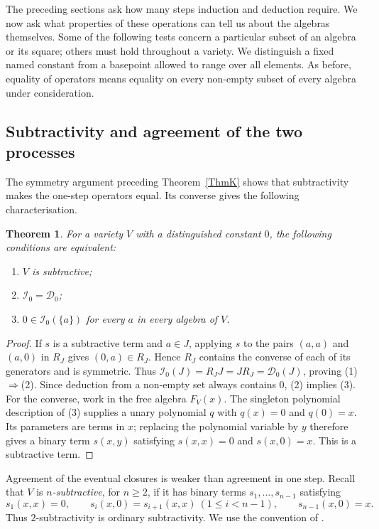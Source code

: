 \documentclass[12pt,english]{amsart}
\newtheorem{theorem}{Theorem}[section]
\theoremstyle{definition}
\numberwithin{equation}{section}
\theoremstyle{remark}
\begin{document}
The preceding sections ask how many steps induction and deduction
require. We now ask what properties of these operations can tell us
about the algebras themselves. Some of the following tests concern a
particular subset of an algebra or its square; others must hold
throughout a variety. We distinguish a fixed named constant from a
basepoint allowed to range over all elements. As before, equality of
operators means equality on every non-empty subset of every algebra
under consideration.

\subsection{Subtractivity and agreement of the two processes}
\label{SubsecDetSubtractivity}

The symmetry argument preceding Theorem~\ref{ThmK} shows that
subtractivity makes the one-step operators equal. Its converse gives
the following characterisation.

\begin{theorem}\label{ThmDetSubtractivity}
For a variety $V$ with a distinguished constant $0$, the following
conditions are equivalent:
\begin{enumerate}
\item $V$ is subtractive;
\item $\mathcal I_0=\mathcal D_0$;
\item $0\in\mathcal I_0(\{a\})$ for every $a$ in every algebra of $V$.
\end{enumerate}
\end{theorem}

\begin{proof}
If $s$ is a subtractive term and $a\in J$, applying $s$ to the pairs
$(a,a)$ and $(a,0)$ in $R_J$ gives $(0,a)\in R_J$. Hence $R_J$
contains the converse of each of its generators and is symmetric.
Thus $\mathcal I_0(J)=R_JJ=JR_J=\mathcal D_0(J)$, proving
(1)$\Rightarrow$(2). Since deduction from a non-empty set always
contains $0$, (2) implies (3). For the converse,
work in the free algebra $F_V(x)$. The singleton polynomial description
of (3) supplies a unary polynomial $q$ with $q(x)=0$ and $q(0)=x$.
Its parameters are terms in $x$; replacing the polynomial variable by
$y$ therefore gives a binary term $s(x,y)$ satisfying
$s(x,x)=0$ and $s(x,0)=x$. This is a subtractive term.
\end{proof}

Agreement of the eventual closures is weaker than agreement in one
step. Recall that $V$ is \emph{$n$-subtractive}, for $n\geqslant2$,
if it has binary terms $s_1,\ldots,s_{n-1}$ satisfying
\begin{equation}\label{EqDetNSubtractive}
s_1(x,x)=0,\qquad
s_i(x,0)=s_{i+1}(x,x)\ (1\leqslant i<n-1),\qquad
s_{n-1}(x,0)=x.
\end{equation}
Thus $2$-subtractivity is ordinary subtractivity. We use the convention
of \cite[Definition 5.6]{DetCS13}.
\end{document}
